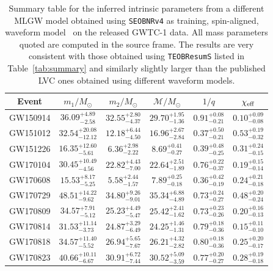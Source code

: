 \begin{table}[t]
\centering
\caption{Summary table for the inferred intrinsic parameters from a different MLGW model obtained using  {\tt SEOBNRv4} as training,
spin-aligned, waveform model~\cite{Bohe:2016gbl} on the released GWTC-1 data. All mass parameters quoted are computed in the 
source frame. The results are very consistent with those obtained using {\tt TEOBResumS} listed in Table~\ref{tab:summary} and similarly
slightly larger than the published LVC ones obtained using different waveform models.} 
\label{tab:summary_seob}
\begin{ruledtabular}
\begin{tabular}{cccccc}
Event    & $m_1/M_\odot$ & $m_2/M_\odot$ & $\mathcal{M}/M_\odot$ & $1/q$ & $\chi_{\rm eff}$ \\ \hline
\vspace{1.0 mm}
GW150914& $36.09_{-2.58}^{+4.89}$& $32.55_{-4.37}^{+2.80}$& $29.70_{-1.36}^{+1.95}$& $0.91_{-0.21}^{+0.08}$& $0.10_{-0.08}^{+0.09}$ \\
\vspace{1.0 mm}
GW151012& $32.54_{-12.12}^{+20.08}$& $12.18_{-4.50}^{+6.44}$& $16.96_{-2.84}^{+2.67}$& $0.37_{-0.21}^{+0.50}$& $0.53_{-0.32}^{+0.19}$\\
\vspace{1.0 mm}
GW151226& $16.35_{-5.61}^{+12.60}$& $6.36_{-2.22}^{+2.98}$& $8.69_{-0.27}^{+0.41}$& $0.39_{-0.25}^{+0.48}$& $0.31_{-0.15}^{+0.24}$\\
\vspace{1.0 mm}
GW170104& $30.45_{-4.56}^{+10.49}$& $22.82_{-7.00}^{+4.43}$& $22.64_{-1.89}^{+2.51}$& $0.76_{-0.37}^{+0.22}$& $0.19_{-0.14}^{+0.15}$\\
\vspace{1.0 mm}
GW170608& $15.53_{-5.25}^{+8.17}$& $5.58_{-1.57}^{+2.44}$& $7.89_{-0.18}^{+0.25}$& $0.36_{-0.19}^{+0.42}$& $0.24_{-0.18}^{+0.21}$\\
\vspace{1.0 mm}
GW170729& $48.51_{-9.62}^{+14.22}$& $34.80_{-9.01}^{+9.26}$& $35.34_{-4.89}^{+6.88}$& $0.73_{-0.27}^{+0.24}$& $0.48_{-0.24}^{+0.20}$\\
\vspace{1.0 mm}
GW170809& $34.57_{-5.12}^{+7.91}$& $25.23_{-5.47}^{+4.49}$& $25.42_{-1.62}^{+2.41}$& $0.73_{-0.26}^{+0.23}$& $0.20_{-0.13}^{+0.16}$\\
\vspace{1.0 mm}
GW170814& $31.53_{-3.73}^{+11.14}$& $24.87_{-6.49}^{+3.29}$& $24.25_{-1.31}^{+1.46}$& $0.79_{-0.36}^{+0.18}$& $0.15_{-0.10}^{+0.11}$\\
\vspace{1.0 mm}
GW170818& $34.57_{-5.52}^{+11.40}$& $26.94_{-7.67}^{+5.65}$& $26.21_{-2.82}^{+4.32}$& $0.80_{-0.36}^{+0.18}$& $0.25_{-0.17}^{+0.20}$\\
\vspace{1.0 mm}
GW170823& $40.66_{-6.67}^{+10.11}$& $30.91_{-7.44}^{+6.72}$& $30.52_{-3.59}^{+5.09}$& $0.77_{-0.27}^{+0.20}$& $0.28_{-0.18}^{+0.19}$\\
\end{tabular}
\end{ruledtabular}
\end{table}

